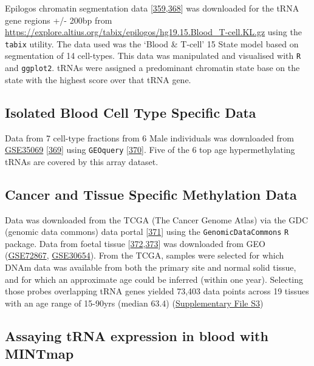 \documentclass[
]{book}
\begin{document}
Epilogos chromatin segmentation data {[}\protect\hyperlink{ref-Ernst2011}{359},\protect\hyperlink{ref-Meuleman2019}{368}{]} was downloaded for the tRNA gene regions +/- 200bp from \url{https://explore.altius.org/tabix/epilogos/hg19.15.Blood_T-cell.KL.gz} using the \texttt{tabix} utility.
The data used was the `Blood \& T-cell' 15 State model based on segmentation of 14 cell-types.
This data was manipulated and visualised with \texttt{R} and \texttt{ggplot2}.
tRNAs were assigned a predominant chromatin state base on the state with the highest score over that tRNA gene.

\hypertarget{sortedbloodmethods}{%
\subsection{Isolated Blood Cell Type Specific Data}\label{sortedbloodmethods}}

Data from 7 cell-type fractions from 6 Male individuals was downloaded from \href{https://www.ncbi.nlm.nih.gov/geo/query/acc.cgi?acc=GSE35069}{GSE35069} {[}\protect\hyperlink{ref-Reinius2012}{369}{]} using \texttt{GEOquery} {[}\protect\hyperlink{ref-Davis2007p}{370}{]}.
Five of the 6 top age hypermethylating tRNAs are covered by this array dataset.

\hypertarget{TCGAmethods}{%
\subsection{Cancer and Tissue Specific Methylation Data}\label{TCGAmethods}}

Data was downloaded from the TCGA (The Cancer Genome Atlas) via the GDC (genomic data commons) data portal {[}\protect\hyperlink{ref-Grossman2016}{371}{]} using the \texttt{GenomicDataCommons} \texttt{R} package.
Data from foetal tissue {[}\protect\hyperlink{ref-Yang2016}{372},\protect\hyperlink{ref-Nazor2012}{373}{]} was downloaded from GEO (\href{https://www.ncbi.nlm.nih.gov/geo/query/acc.cgi?acc=GSE72867}{GSE72867}, \href{https://www.ncbi.nlm.nih.gov/geo/query/acc.cgi?acc=GSE30654}{GSE30654}).
From the TCGA, samples were selected for which DNAm data was available from both the primary site and normal solid tissue, and for which an approximate age could be inferred (within one year).
Selecting those probes overlapping tRNA genes yielded 73,403 data points across 19 tissues with an age range of 15-90yrs (median 63.4) (\href{./Supplementary_Files/TCGA_samples_used.tsv}{Supplementary File S3})

\hypertarget{mintmapmethods}{%
\subsection{Assaying tRNA expression in blood with MINTmap}\label{mintmapmethods}}
\end{document}
